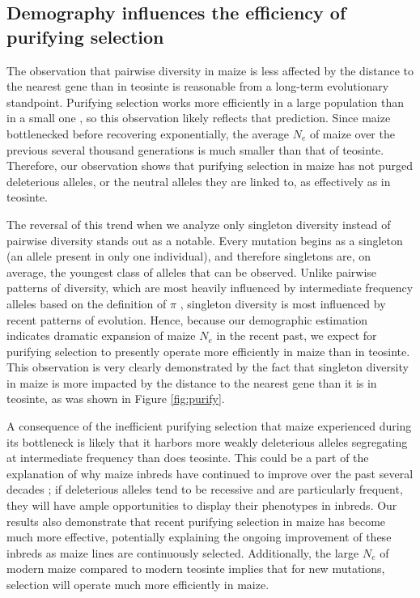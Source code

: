 \documentclass{pnastwo}
\begin{document}
\begin{article}
\subsection{Demography influences the efficiency of purifying selection}
The observation that pairwise diversity in maize is less affected by the distance to the nearest gene than in teosinte is reasonable from a long-term evolutionary standpoint. Purifying selection works more efficiently in a large population than in a small one \cite{kimura1984}, so this observation likely reflects that prediction. Since maize bottlenecked before recovering exponentially, the average $N_e$ of maize over the previous several thousand generations is much smaller than that of teosinte. Therefore, our observation shows that purifying selection in maize has not purged deleterious alleles, or the neutral alleles they are linked to, as effectively as in teosinte.

The reversal of this trend when we analyze only singleton diversity instead of pairwise diversity stands out as a notable. Every mutation begins as a singleton (an allele present in only one individual), and therefore singletons are, on average, the youngest class of alleles that can be observed. Unlike pairwise patterns of diversity, which are most heavily influenced by intermediate frequency alleles based on the definition of $\pi$ \cite{nei1979}, singleton diversity is most influenced by recent patterns of evolution. Hence, because our demographic estimation indicates dramatic expansion of maize $N_e$ in the recent past, we expect for purifying selection to presently operate more efficiently in maize than in teosinte. This observation is very clearly demonstrated by the fact that singleton diversity in maize is more impacted by the distance to the nearest gene than it is in teosinte, as was shown in Figure \ref{fig:purify}.

A consequence of the inefficient purifying selection that maize experienced during its bottleneck is likely that it harbors more weakly deleterious alleles segregating at intermediate frequency than does teosinte. This could be a part of the explanation of why maize inbreds have continued to improve over the past several decades \cite{meghji1984}; if deleterious alleles tend to be recessive and are particularly frequent, they will have ample opportunities to display their phenotypes in inbreds. Our results also demonstrate that recent purifying selection in maize has become much more effective, potentially explaining the ongoing improvement of these inbreds as maize lines are continuously selected. Additionally, the large $N_e$ of modern maize compared to modern teosinte implies that for new mutations, selection will operate much more efficiently in maize.


\end{article}
\end{document}
